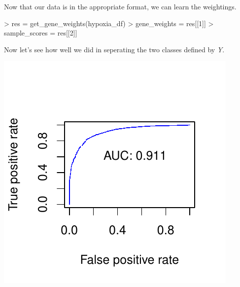 \documentclass{article}
\begin{document}
Now that our data is in the appropriate format, we can learn the weightings.
\begin{Schunk}
\begin{Sinput}
> res = get_gene_weights(hypoxia_df)
> gene_weights = res[[1]]
> sample_scores = res[[2]]
\end{Sinput}
\end{Schunk}

Now let's see how well we did in seperating the two classes defined by \emph{Y}.
\begin{Schunk}
\end{Schunk}
\includegraphics{ssPATHS-009}
\end{document}
